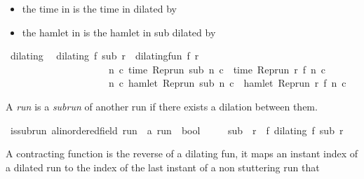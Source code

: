 \begin{isabellebody}
\begin{isamarkuptext}
\begin{itemize}
\item the time in  is the time in  dilated by 

\item the hamlet in  is the hamlet in sub dilated by %
\end{itemize}%
\end{isamarkuptext}\isamarkuptrue%
\isamarkupfalse%
\ dilating\isanewline
{}\isanewline
\ \ {\isacartoucheopen}dilating\ f\ sub\ r\ {\isasymequiv}\ dilating{\isacharunderscore}fun\ f\ r\isanewline
\ \ \ \ \ \ \ \ \ \ \ \ \ \ \ \ \ \ \ \ {\isasymand}\ {\isacharparenleft}{\isasymforall}n\ c{\isachardot}\ time\ {\isacharparenleft}{\isacharparenleft}Rep{\isacharunderscore}run\ sub{\isacharparenright}\ n\ c{\isacharparenright}\ {\isacharequal}\ time\ {\isacharparenleft}{\isacharparenleft}Rep{\isacharunderscore}run\ r{\isacharparenright}\ {\isacharparenleft}f\ n{\isacharparenright}\ c{\isacharparenright}{\isacharparenright}\isanewline
\ \ \ \ \ \ \ \ \ \ \ \ \ \ \ \ \ \ \ \ {\isasymand}\ {\isacharparenleft}{\isasymforall}n\ c{\isachardot}\ hamlet\ {\isacharparenleft}{\isacharparenleft}Rep{\isacharunderscore}run\ sub{\isacharparenright}\ n\ c{\isacharparenright}\ {\isacharequal}\ hamlet\ {\isacharparenleft}{\isacharparenleft}Rep{\isacharunderscore}run\ r{\isacharparenright}\ {\isacharparenleft}f\ n{\isacharparenright}\ c{\isacharparenright}{\isacharparenright}{\isacartoucheclose}%
\begin{isamarkuptext}%
A \emph{run} is a \emph{subrun} of another run if there exists a dilation between them.%
\end{isamarkuptext}\isamarkuptrue%
\isamarkupfalse%
\ is{\isacharunderscore}subrun\ {\isacharcolon}{\isacharcolon}{\isacartoucheopen}{\isacharprime}a{\isacharcolon}{\isacharcolon}linordered{\isacharunderscore}field\ run\ {\isasymRightarrow}\ {\isacharprime}a\ run\ {\isasymRightarrow}\ bool{\isacartoucheclose}\ {\isacharparenleft}\ {\isachardoublequoteopen}{\isasymlless}{\isachardoublequoteclose}\ {}{}{\isacharparenright}\isanewline
{}\isanewline
\ \ {\isacartoucheopen}sub\ {\isasymlless}\ r\ {\isasymequiv}\ {\isacharparenleft}{\isasymexists}f{\isachardot}\ dilating\ f\ sub\ r{\isacharparenright}{\isacartoucheclose}%
\begin{isamarkuptext}%
A contracting function is the reverse of a dilating fun, it maps an instant index 
  of a dilated run to the index of the last instant of a non stuttering run that

\end{isamarkuptext}
\end{isabellebody}
